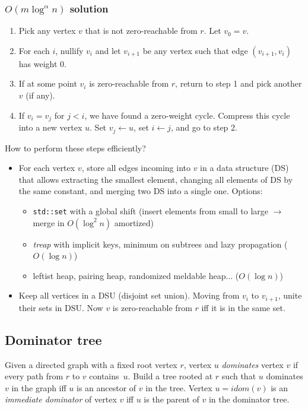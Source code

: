\subsubsection*{$O(m \log^\alpha n)$ solution}
\begin{enumerate}
\item Pick any vertex $v$ that is not zero-reachable from $r$. Let $v_0 = v$.
\item For each $i$, nullify $v_i$ and let $v_{i+1}$ be any vertex such that edge $(v_{i+1}, v_{i})$ has weight 0.
\item If at some point $v_i$ is zero-reachable from $r$, return to step 1 and pick another $v$ (if any).
\item If $v_i = v_j$ for $j < i$, we have found a zero-weight cycle. Compress this cycle into a new vertex $u$. \newline Set $v_j \gets u$, set $i \gets j$, and go to step 2.
\end{enumerate}
How to perform these steps efficiently?
\begin{itemize}
\item For each vertex $v$, store all edges incoming into $v$ in a data structure (DS) that allows extracting the smallest element, changing all elements of DS by the same constant, and merging two DS into a single one. Options:
 \begin{itemize}
  \item \texttt{std::set} with a global shift (insert elements from small to large $\rightarrow$ merge in $O(\log^2 n)$ amortized)
  \item \textit{treap} with implicit keys, minimum on subtrees and lazy propagation ($O(\log n)$)
  \item leftist heap, pairing heap, randomized meldable heap... ($O(\log n)$)
 \end{itemize}
\item Keep all vertices in a DSU (disjoint set union). Moving from $v_i$ to $v_{i+1}$, unite their sets in DSU. Now $v$ is zero-reachable from $r$ iff it is in the same set.
\end{itemize}
\subsection{Dominator tree}
Given a directed graph with a fixed root vertex $r$, vertex $u$ \textit{dominates} vertex $v$ if every path from $r$ to $v$ contains~$u$. Build a tree rooted at $r$ such that $u$ dominates $v$ in the graph iff $u$ is an ancestor of $v$ in the tree.
\newline \newline
Vertex $u = idom(v)$ is an \textit{immediate dominator} of vertex $v$ iff $u$ is the parent of $v$ in the dominator tree.
